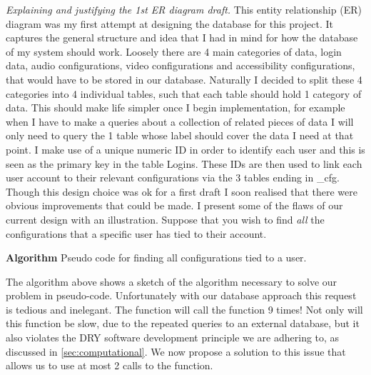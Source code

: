 \textit{Explaining and justifying the 1st ER diagram draft.}
This entity relationship (ER) diagram was my first attempt at
designing the database for this project. It captures the
general structure and idea that I had in mind for how the
database of my system should work. Loosely there are 4 main
categories of data, login data, audio configurations,
video configurations and accessibility configurations, that
would have to be stored in our database. Naturally I decided
to split these 4 categories into 4 individual tables, such
that each table should hold 1 category of data. This should
make life simpler once I begin implementation, for example
when I have to make a queries about a collection of related
pieces of data I will only need to query the 1 table whose
label should cover the data I need at that point. I make use
of a unique numeric ID in order to identify each user and this
is seen as the primary key in the table {\sffamily Logins}.
These IDs are then used to link each user account to their
relevant configurations via the 3 tables ending in
{\sffamily \_cfg}. Though this design choice was ok for a
first draft I soon realised that there were obvious
improvements that could be made. I present some of the flaws
of our current design with an illustration. Suppose that you
wish to find \emph{all} the configurations that a specific
user has tied to their account.

\begin{algorithm}
\caption*{\textbf{Algorithm} Pseudo code for finding all
configurations tied to a user.}
\label{alg:long}
\sffamily

\begin{algorithmic}[1]
     
    \State{}

    \State{\ldots}
    \State{}

  \EndFunction
\end{algorithmic}

\end{algorithm}

\mdseries

The algorithm above shows a sketch of the algorithm
necessary to solve our problem in pseudo-code. Unfortunately
with our database approach this request is tedious and
inelegant. The function will call the 
function 9 times! Not only will this function be slow, due to
the repeated queries to an external database, but it
also violates the DRY software development principle we are
adhering to, as discussed in \ref{sec:computational}. We now
propose a solution to this issue that allows us to use at most
2 calls to the  function.


